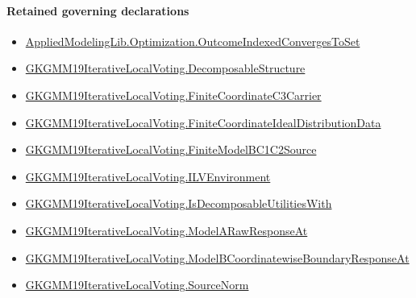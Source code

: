 \documentclass[10pt]{article}
\begin{document}
\paragraph{Retained governing declarations}
\begin{itemize}\raggedright
\item \hyperlink{governing-declaration-e058c109f5f0617c}{Applied\allowbreak{}Modeling\allowbreak{}Lib.\allowbreak{}Optimization.\allowbreak{}Outcome\allowbreak{}Indexed\allowbreak{}Converges\allowbreak{}To\allowbreak{}Set}
\item \hyperlink{governing-declaration-1a64387d28e6d56d}{GKGMM19\allowbreak{}Iterative\allowbreak{}Local\allowbreak{}Voting.\allowbreak{}Decomposable\allowbreak{}Structure}
\item \hyperlink{governing-declaration-56987670c9ba555c}{GKGMM19\allowbreak{}Iterative\allowbreak{}Local\allowbreak{}Voting.\allowbreak{}Finite\allowbreak{}Coordinate\allowbreak{}C3\allowbreak{}Carrier}
\item \hyperlink{governing-declaration-57171116eb928bf6}{GKGMM19\allowbreak{}Iterative\allowbreak{}Local\allowbreak{}Voting.\allowbreak{}Finite\allowbreak{}Coordinate\allowbreak{}Ideal\allowbreak{}Distribution\allowbreak{}Data}
\item \hyperlink{governing-declaration-b2172f203bb89b25}{GKGMM19\allowbreak{}Iterative\allowbreak{}Local\allowbreak{}Voting.\allowbreak{}Finite\allowbreak{}Model\allowbreak{}BC1\allowbreak{}C2\allowbreak{}Source}
\item \hyperlink{governing-declaration-df2ca62df1846667}{GKGMM19\allowbreak{}Iterative\allowbreak{}Local\allowbreak{}Voting.\allowbreak{}ILV\allowbreak{}Environment}
\item \hyperlink{governing-declaration-ccb024dc87ffc578}{GKGMM19\allowbreak{}Iterative\allowbreak{}Local\allowbreak{}Voting.\allowbreak{}Is\allowbreak{}Decomposable\allowbreak{}Utilities\allowbreak{}With}
\item \hyperlink{governing-declaration-24745e7c99610404}{GKGMM19\allowbreak{}Iterative\allowbreak{}Local\allowbreak{}Voting.\allowbreak{}Model\allowbreak{}A\allowbreak{}Raw\allowbreak{}Response\allowbreak{}At}
\item \hyperlink{governing-declaration-b594ba8d8a1eacd7}{GKGMM19\allowbreak{}Iterative\allowbreak{}Local\allowbreak{}Voting.\allowbreak{}Model\allowbreak{}B\allowbreak{}Coordinatewise\allowbreak{}Boundary\allowbreak{}Response\allowbreak{}At}
\item \hyperlink{governing-declaration-6fa4ab9852321b03}{GKGMM19\allowbreak{}Iterative\allowbreak{}Local\allowbreak{}Voting.\allowbreak{}Source\allowbreak{}Norm}

\end{itemize}
\end{document}
